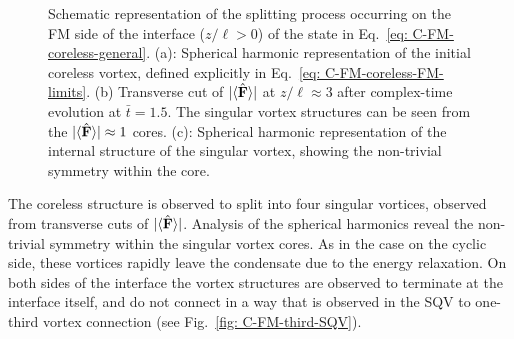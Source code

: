 \begin{figure}
    \caption[Dynamics of the coreless vortex in a cyclic to ferromagnetic
        interface]
    {\label{fig: C-FM-coreless-FM}Schematic representation of the
        splitting process occurring on the FM side of the interface
        (\(z/\ell > 0\)) of the state in Eq.~\eqref{eq: C-FM-coreless-general}.
        (a): Spherical harmonic representation of the initial coreless vortex,
        defined explicitly in Eq.~\eqref{eq: C-FM-coreless-FM-limits}.
        (b) Transverse cut of \(|\langle \hat{\vb{F}} \rangle | \) at \(z/\ell \approx 3\) after
        complex-time evolution at \(\bar{t} = 1.5\).
        The singular vortex structures can be seen from the
        \(|\langle \hat{\vb{F}} \rangle | \approx 1\) cores.
        (c): Spherical harmonic representation of the internal structure of
        the singular vortex, showing the non-trivial symmetry within the core.}
\end{figure}
The coreless structure is observed to split into four singular vortices,
observed from transverse cuts of \(|\langle \hat{\vb{F}} \rangle | \).
Analysis of the spherical harmonics reveal the non-trivial symmetry within
the singular vortex cores.
As in the case on the cyclic side, these vortices rapidly leave the condensate
due to the energy relaxation.
On both sides of the interface the vortex structures are observed to terminate
at the interface itself, and do not connect in a way that is observed in the
SQV to one-third vortex connection (see Fig.~\ref{fig: C-FM-third-SQV}).

